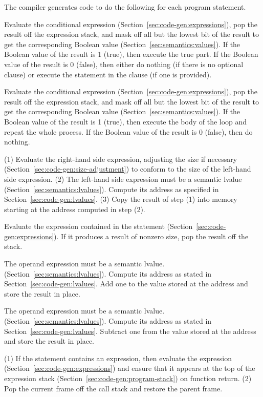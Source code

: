 \documentclass[10pt]{article}
\begin{document}
The compiler generates code to do the following for each program
statement.

 Evaluate the conditional expression
(Section~\ref{sec:code-gen:expressions}), pop the result off the
expression stack, and mask off all but the lowest bit of the result to
get the corresponding Boolean value
(Section~\ref{sec:semantics:values}).  If the Boolean value of the
result is 1 (true), then execute the true part.  If the Boolean value
of the result is 0 (false), then either do nothing (if there is no
optional  clause) or execute the statement in the 
clause (if one is provided).

 Evaluate the conditional expression
(Section~\ref{sec:code-gen:expressions}), pop the result off the
expression stack, and mask off all but the lowest bit of the result to
get the corresponding Boolean value
(Section~\ref{sec:semantics:values}).  If the Boolean value of the
result is 1 (true), then execute the body of the loop and repeat the
whole process.  If the Boolean value of the result is 0 (false), then
do nothing.

  (1) Evaluate the right-hand side expression,
adjusting the size if necessary
(Section~\ref{sec:code-gen:size-adjustment}) to conform to the size of
the left-hand side expression.  (2) The left-hand side expression must
be a semantic lvalue (Section~\ref{sec:semantics:lvalues}). Compute
its address as specified in Section~\ref{sec:code-gen:lvalues}.  (3)
Copy the result of step (1) into memory starting at the address
computed in step (2).

 Evaluate the expression contained in the
statement (Section~\ref{sec:code-gen:expressions}).  If it produces a
result of nonzero size, pop the result off the stack.

 The operand expression must be a
semantic lvalue. (Section~\ref{sec:semantics:lvalues}).  Compute its
address as stated in Section~\ref{sec:code-gen:lvalues}.  Add one to
the value stored at the address and store the result in place.

 The operand expression must be a
semantic lvalue. (Section~\ref{sec:semantics:lvalues}).  Compute its
address as stated in Section~\ref{sec:code-gen:lvalues}.  Subtract one
from the value stored at the address and store the result in place.

 (1) If the statement contains an
expression, then evaluate the expression
(Section~\ref{sec:code-gen:expressions}) and ensure that it appears at
the top of the expression stack
(Section~\ref{sec:code-gen:program-stack}) on function return.  (2)
Pop the current frame off the call stack and restore the parent frame.
\end{document}
